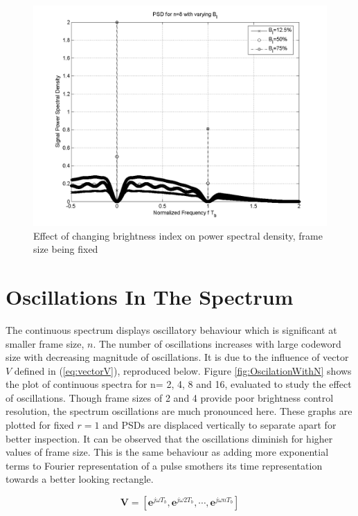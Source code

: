  \begin{figure}[hbtp]
  \includegraphics[width=\figwidth]{./Figures/fixN2.png}  
  \caption[Effect of brightness index on PSD]{Effect of changing brightness index on power spectral density, frame size being fixed}
  \label {fig:fix_n}
 \end{figure}

\section{Oscillations In The Spectrum}
The continuous spectrum displays oscillatory behaviour which is significant at smaller frame size, $n$.  The number of oscillations increases with large codeword size with decreasing magnitude of oscillations. It is due to the influence of vector $V$ defined in (\ref{eq:vectorV}), reproduced below. Figure \ref{fig:OscilationWithN} shows the plot of continuous spectra for n= 2, 4, 8 and 16, evaluated to study the effect of oscillations. Though frame sizes of 2 and 4 provide poor brightness control resolution, the spectrum oscillations are much pronounced here. These graphs are plotted for fixed $r=1$ and PSDs are displaced vertically to separate apart for better inspection. It can be observed that the oscillations diminish for higher values of frame size. This is the same behaviour as adding more exponential terms to Fourier representation of a pulse smothers its time representation towards a better looking rectangle.

\[
	\mathbf{V}= \left[\mathbf{e}^{j\omega T_b}, \mathbf{e}^{j\omega 2T_b}, \cdots,\mathbf{e}^{j\omega nT_b}\right]
\]

